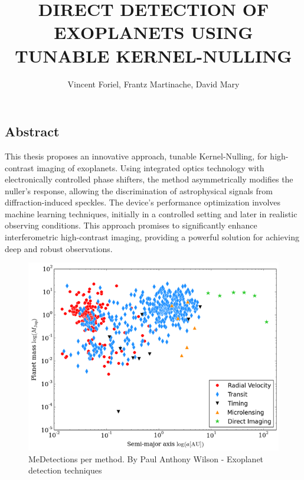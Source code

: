 \documentclass[isoft]{ufgtexposter}
\title{\uppercase{Direct Detection of Exoplanets using Tunable Kernel-Nulling}}
\author{Vincent Foriel, Frantz Martinache, David Mary}
\begin{document}
    \begin{poster}
    
    \section{Abstract}
        
        This thesis proposes an innovative approach, tunable Kernel-Nulling, for high-contrast imaging of exoplanets. Using integrated optics technology with electronically controlled phase shifters, the method asymmetrically modifies the nuller's response, allowing the discrimination of astrophysical signals from diffraction-induced speckles. The device's performance optimization involves machine learning techniques, initially in a controlled setting and later in realistic observing conditions. This approach promises to significantly enhance interferometric high-contrast imaging, providing a powerful solution for achieving deep and robust observations.

        \begin{figure}
            \centering
            \captionsetup{type=figure}
            \includegraphics[scale=1.5]{images/detection_technics.png}
            \caption{MeDetections per method. By Paul Anthony Wilson - Exoplanet detection techniques}
            \label{fig:detection_methods}
        \end{figure}


\end{poster}
\end{document}
